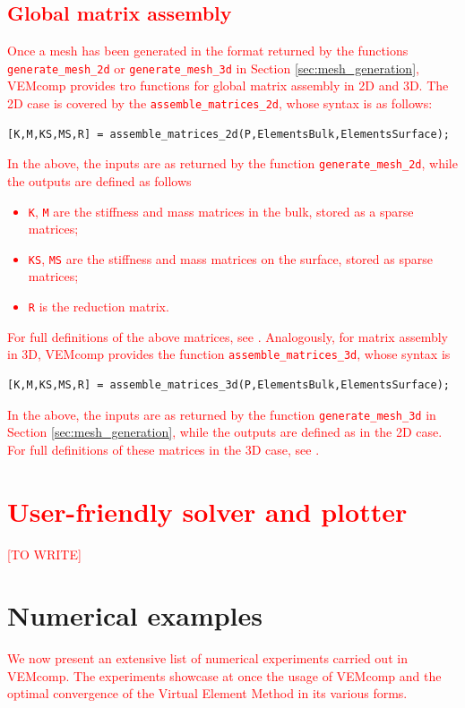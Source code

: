 \documentclass[a4paper]{article}
\newcommand{\red}[1]{\textcolor{red}{#1}}
\begin{document}
\subsection{\red{Global matrix assembly}}
\red{
Once a mesh has been generated in the format returned by the functions \texttt{generate\_mesh\_2d} or  \texttt{generate\_mesh\_3d} in Section \ref{sec:mesh_generation},  VEMcomp provides tro functions for global matrix assembly in 2D and 3D. The 2D case is covered by the \texttt{assemble\_matrices\_2d}, whose syntax is as follows:}
\begin{lstlisting}
[K,M,KS,MS,R] = assemble_matrices_2d(P,ElementsBulk,ElementsSurface);
\end{lstlisting}
\red{
In the above, the inputs are as returned by the function \texttt{generate\_mesh\_2d}, while the outputs are defined as follows
\begin{itemize}
\item \texttt{K}, \texttt{M} are the stiffness and mass matrices in the bulk, stored as a sparse matrices;
\item \texttt{KS}, \texttt{MS} are the stiffness and mass matrices on the surface, stored as sparse matrices;
\item \texttt{R} is the reduction matrix.
\end{itemize}
For full definitions of the above matrices, see \cite{frittelli2021bulk}. Analogously,  for matrix assembly in 3D, VEMcomp provides the function \texttt{assemble\_matrices\_3d}, whose syntax is}
\begin{lstlisting}
[K,M,KS,MS,R] = assemble_matrices_3d(P,ElementsBulk,ElementsSurface);
\end{lstlisting}
\red{
In the above,  the inputs are as returned by the function \texttt{generate\_mesh\_3d} in Section \ref{sec:mesh_generation}, while the outputs are defined as in the 2D case.  For full definitions of these matrices in the 3D case, see \cite{frittelli2023elliptic}.}

\section{\red{User-friendly solver and plotter}}
\label{sec:user_friendly_solver}
\red{[TO WRITE]}


\section{Numerical examples}
\label{sec:numerical_examples}
\red{We now present an extensive list of numerical experiments carried out in VEMcomp. The experiments showcase at once the usage of VEMcomp and the optimal convergence of the Virtual Element Method in its various forms.}
\end{document}
